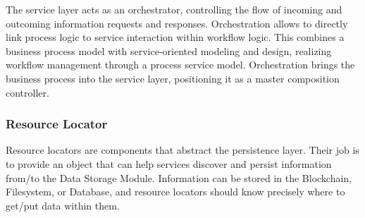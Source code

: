 The service layer acts as an orchestrator, controlling the flow of incoming and outcoming information requests and responses. Orchestration allows to directly link process logic to service interaction within workflow logic. This combines a business process model with service-oriented modeling and design, realizing workflow management through a process service model. Orchestration brings the business process into the service layer, positioning it as a master composition controller.

\subsubsection{Resource Locator}\label{sec:ResourceLocator}

Resource locators are components that abstract the persistence layer. Their job is to provide an object that can help services discover and persist information from/to the Data Storage Module. Information can be stored in the Blockchain, Filesystem, or Database, and resource locators should know precisely where to get/put data within them.  